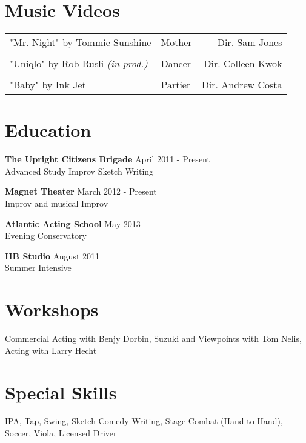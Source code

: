 \begin{resume}
\section{Music Videos}
\begin{tabular*}{\textwidth}{@{\extracolsep{\fill} } llr}
"Mr. Night" by Tommie Sunshine&Mother&Dir. Sam Jones\\\\
"Uniqlo" by Rob Rusli \textit{(in prod.)}&Dancer&Dir. Colleen Kwok\\\\
"Baby" by Ink Jet&Partier&Dir. Andrew Costa
\end{tabular*}

\section{Education}

{\bf The Upright Citizens Brigade} \hfill April 2011 -  Present\\
Advanced Study Improv
Sketch Writing

{\bf Magnet Theater} \hfill March 2012 -  Present\\
Improv and musical Improv

{\bf Atlantic Acting School} \hfill May 2013 \\
Evening Conservatory

{\bf HB Studio} \hfill August 2011 \\
Summer Intensive

\section{Workshops}

Commercial Acting with Benjy Dorbin, Suzuki and Viewpoints with Tom Nelis, Acting with Larry Hecht

\section{Special Skills}

IPA, Tap, Swing, Sketch Comedy Writing, Stage Combat (Hand-to-Hand), Soccer, Viola, Licensed Driver


\end{resume}
